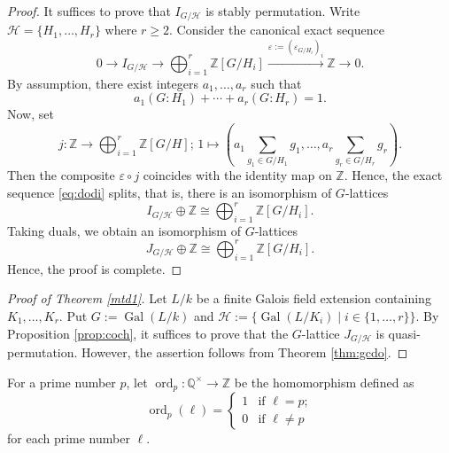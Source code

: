 \documentclass[12pt]{amsart}
\theoremstyle{plain}
\theoremstyle{definition}
\numberwithin{thm}{section}
\numberwithin{equation}{section}
\newcommand{\Z}{\mathbb{Z}}
\newcommand{\Q}{\mathbb{Q}}
\newcommand{\cH}{\mathcal{H}}
\DeclareMathOperator{\ord}{ord}
\DeclareMathOperator{\Gal}{Gal}
\begin{document}
\begin{proof}
It suffices to prove that $I_{G/\cH}$ is stably permutation. Write $\cH=\{H_{1},\ldots,H_{r}\}$ where $r\geq 2$. Consider the canonical exact sequence
\begin{equation}\label{eq:dodi}
0\rightarrow I_{G/\cH}\rightarrow \bigoplus_{i=1}^{r}\Z[G/H_{i}]\xrightarrow{\varepsilon:=(\varepsilon_{G/H_{i}})_{i}} \Z \rightarrow 0. 
\end{equation}
By assumption, there exist integers $a_{1},\ldots,a_{r}$ such that
\begin{equation*}
a_{1}(G:H_{1})+\cdots +a_{r}(G:H_{r})=1. 
\end{equation*}
Now, set
\begin{equation*}
j\colon \Z \rightarrow \bigoplus_{i=1}^{r}\Z[G/H];\,1 \mapsto \left(a_{1}\sum_{g_{1}\in G/H_{1}}g_{1},\ldots,a_{r}\sum_{g_{r}\in G/H_{r}}g_{r}\right). 
\end{equation*}
Then the composite $\varepsilon \circ j$ coincides with the identity map on $\Z$. Hence, the exact sequence \eqref{eq:dodi} splits, that is, there is an isomorphism of $G$-lattices
\begin{equation*}
I_{G/\cH}\oplus \Z \cong \bigoplus_{i=1}^{r}\Z[G/H_{i}]. 
\end{equation*}
Taking duals, we obtain an isomorphism of $G$-lattices
\begin{equation*}
J_{G/\cH}\oplus \Z \cong \bigoplus_{i=1}^{r}\Z[G/H_{i}]. 
\end{equation*}
Hence, the proof is complete. 
\end{proof}

\begin{proof}[Proof of Theorem \ref{mtd1}]
Let $L/k$ be a finite Galois field extension containing $K_{1},\ldots,K_{r}$. Put $G:=\Gal(L/k)$ and $\cH:=\{\Gal(L/K_{i})\mid i\in \{1,\ldots,r\}\}$. By Proposition \ref{prop:coch}, it suffices to prove that the $G$-lattice $J_{G/\cH}$ is quasi-permutation. However, the assertion follows from Theorem \ref{thm:gcdo}. 
\end{proof}

For a prime number $p$, let $\ord_{p}\colon \Q^{\times}\rightarrow \Z$ be the homomorphism defined as
\begin{equation*}
\ord_{p}(\ell)=
\begin{cases}
1&\text{if }\ell=p;\\
0&\text{if }\ell \neq p
\end{cases}
\end{equation*}
for each prime number $\ell$. 
\end{document}
